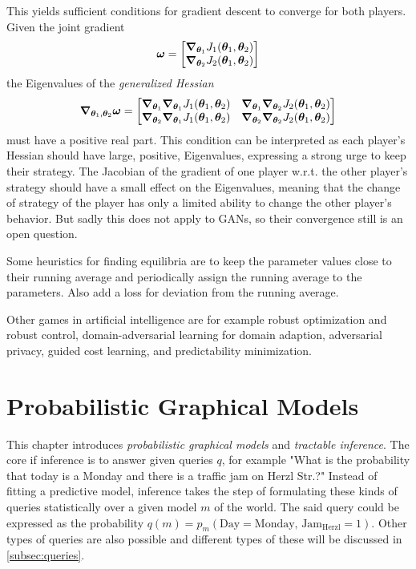 		This yields sufficient conditions for gradient descent to converge for both players. Given the joint gradient
		\begin{equation}
			\bm{\omega} =
				\begin{bmatrix}
					\grad_{\bm{\theta}_1} J_1(\bm{\theta}_1, \bm{\theta}_2) \\
					\grad_{\bm{\theta}_2} J_2(\bm{\theta}_1, \bm{\theta}_2)
				\end{bmatrix}
		\end{equation}
		the Eigenvalues of the \emph{generalized Hessian}
		\begin{equation}
			\grad_{\bm{\theta}_1, \bm{\theta}_2} \bm{\omega} =
				\begin{bmatrix}
					\grad_{\bm{\theta}_1} \grad_{\bm{\theta}_1} J_1(\bm{\theta}_1, \bm{\theta}_2) & \grad_{\bm{\theta}_1} \grad_{\bm{\theta}_2} J_2(\bm{\theta}_1, \bm{\theta}_2) \\
					\grad_{\bm{\theta}_2} \grad_{\bm{\theta}_1} J_1(\bm{\theta}_1, \bm{\theta}_2) & \grad_{\bm{\theta}_2} \grad_{\bm{\theta}_2} J_2(\bm{\theta}_1, \bm{\theta}_2)
				\end{bmatrix}
		\end{equation}
		must have a positive real part. This condition can be interpreted as each player's Hessian should have large, positive, Eigenvalues, expressing a strong urge to keep their strategy. The Jacobian of the gradient of one player w.r.t. the other player's strategy should have a small effect on the Eigenvalues, meaning that the change of strategy of the player has only a limited ability to change the other player's behavior. But sadly this does not apply to GANs, so their convergence still is an open question.

		Some heuristics for finding equilibria are to keep the parameter values close to their running average and periodically assign the running average to the parameters. Also add a loss for deviation from the running average.

		Other games in artificial intelligence are for example robust optimization and robust control, domain-adversarial learning for domain adaption, adversarial privacy, guided cost learning, and predictability minimization.

\chapter{Probabilistic Graphical Models}
	This chapter introduces \emph{probabilistic graphical models} and \emph{tractable inference}. The core if inference is to answer given queries \(q\), for example "What is the probability that today is a Monday and there is a traffic jam on Herzl Str.?" Instead of fitting a predictive model, inference takes the step of formulating these kinds of queries statistically over a given model \(m\) of the world. The said query could be expressed as the probability \( q(m) = p_{m}(\text{Day} = \text{Monday},\, \text{Jam}_\text{Herzl} = 1) \). Other types of queries are also possible and different types of these will be discussed in \autoref{subsec:queries}.

